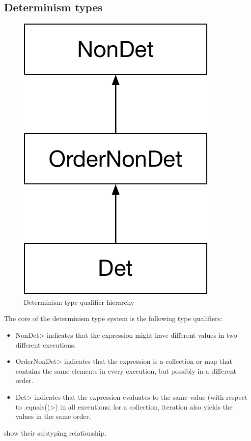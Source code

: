 \subsection{Determinism types}\label{type-hierarchy}

\begin{figure}
    \begin{center}
        \includegraphics[scale=0.37]{detHierarchy}
    \end{center}
    \caption{Determinism type qualifier hierarchy}
    \label{fig:determinism-hierarchy}
\end{figure}

The core of the determinism type system is the following type qualifiers:
\begin{itemize}
    \item \<NonDet> indicates
    that the expression might have different values in two different executions.
    \item \<OrderNonDet> indicates that the expression is a collection or
      map that contains the same elements in every execution, but possibly
      in a different order.
    \item \<Det> indicates that
    the expression evaluates to the same value (with respect to \<.equals()>) in all
    executions; for a collection, iteration also yields the values in the same
    order.
\end{itemize}
 show their subtyping relationship.

